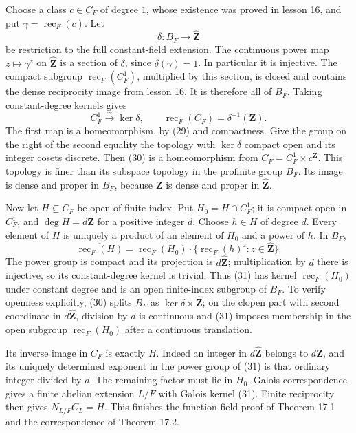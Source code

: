 \documentclass[11pt,a4paper]{article}
\begin{document}
Choose a class \(c\in C_F\) of degree \(1\), whose existence was proved
in lesson 16, and put \(\gamma=\operatorname{rec}_F(c)\). Let \[
\delta:B_F\longrightarrow\widehat{\mathbf Z}
\] be restriction to the full constant-field extension. The continuous
power map \(z\mapsto\gamma^z\) on \(\widehat{\mathbf Z}\) is a section
of \(\delta\), since \(\delta(\gamma)=1\). In particular it is
injective. The compact subgroup \(\operatorname{rec}_F(C_F^1)\),
multiplied by this section, is closed and contains the dense reciprocity
image from lesson 16. It is therefore all of \(B_F\). Taking
constant-degree kernels gives \[
C_F^1\xrightarrow{\sim}\ker\delta,
\qquad
\operatorname{rec}_F(C_F)=\delta^{-1}(\mathbf Z).
\tag{30}
\] The first map is a homeomorphism, by (29) and compactness. Give the
group on the right of the second equality the topology with
\(\ker\delta\) compact open and its integer cosets discrete. Then (30)
is a homeomorphism from \(C_F=C_F^1\times c^{\mathbf Z}\). This topology
is finer than its subspace topology in the profinite group \(B_F\). Its
image is dense and proper in \(B_F\), because \(\mathbf Z\) is dense and
proper in \(\widehat{\mathbf Z}\).

Now let \(H\subseteq C_F\) be open of finite index. Put
\(H_0=H\cap C_F^1\); it is compact open in \(C_F^1\), and
\(\deg H=d\mathbf Z\) for a positive integer \(d\). Choose \(h\in H\) of
degree \(d\). Every element of \(H\) is uniquely a product of an element
of \(H_0\) and a power of \(h\). In \(B_F\), \[
\overline{\operatorname{rec}_F(H)}
=\operatorname{rec}_F(H_0)\cdot
\{\operatorname{rec}_F(h)^z:z\in\widehat{\mathbf Z}\}.
\tag{31}
\] The power group is compact and its projection is
\(d\widehat{\mathbf Z}\); multiplication by \(d\) there is injective, so
its constant-degree kernel is trivial. Thus (31) has kernel
\(\operatorname{rec}_F(H_0)\) under constant degree and is an open
finite-index subgroup of \(B_F\). To verify openness explicitly, (30)
splits \(B_F\) as \(\ker\delta\times\widehat{\mathbf Z}\); on the clopen
part with second coordinate in \(d\widehat{\mathbf Z}\), division by
\(d\) is continuous and (31) imposes membership in the open subgroup
\(\operatorname{rec}_F(H_0)\) after a continuous translation.

Its inverse image in \(C_F\) is exactly \(H\). Indeed an integer in
\(d\widehat{\mathbf Z}\) belongs to \(d\mathbf Z\), and its uniquely
determined exponent in the power group of (31) is that ordinary integer
divided by \(d\). The remaining factor must lie in \(H_0\). Galois
correspondence gives a finite abelian extension \(L/F\) with Galois
kernel (31). Finite reciprocity then gives \(N_{L/F}C_L=H\). This
finishes the function-field proof of Theorem 17.1 and the correspondence
of Theorem 17.2.
\end{document}

